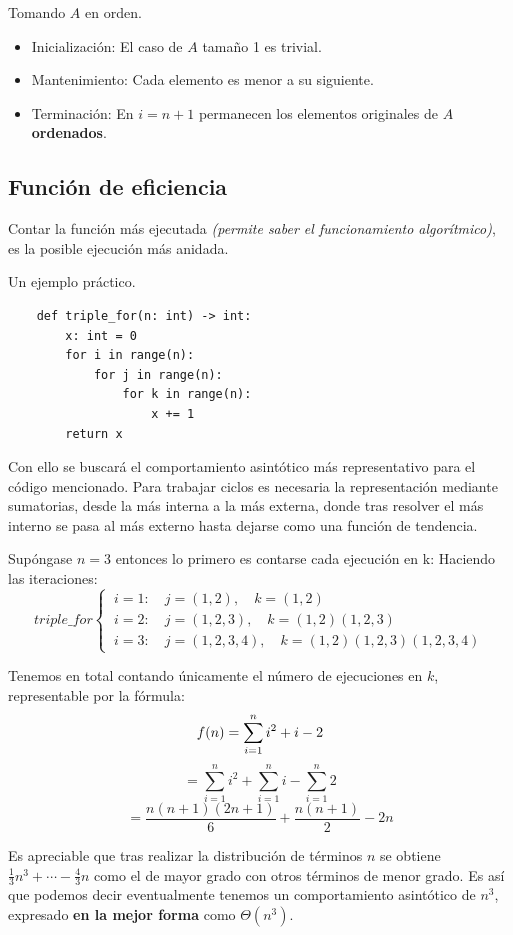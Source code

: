 \documentclass[tikz,11pt,fleqn]{book} %
\begin{document}
\begin{example}
Tomando $A$ en orden.
    \begin{itemize}
        \item Inicialización: El caso de $A$ tamaño 1 es trivial.
        \item Mantenimiento: Cada elemento es menor a su siguiente.
        \item Terminación: En $i=n+1$ permanecen los elementos originales de $A$ \textbf{ordenados}.
    \end{itemize}
\end{example}

\subsection{Función de eficiencia}

Contar la función más ejecutada \textit{(permite saber el funcionamiento algorítmico)}, es la posible ejecución más anidada.


\begin{example}
Un ejemplo práctico.

    \begin{lstlisting}
    def triple_for(n: int) -> int:
        x: int = 0
        for i in range(n):
            for j in range(n):
                for k in range(n):
                    x += 1
        return x
    \end{lstlisting}

    Con ello se buscará el comportamiento asintótico más representativo para el código mencionado.
    Para trabajar ciclos es necesaria la representación mediante sumatorias, desde la más interna a la más externa, donde tras resolver el más interno se pasa al más 
    externo hasta dejarse como una función de tendencia.

    Supóngase $n=3$ entonces lo primero es contarse cada ejecución en k:
    Haciendo las iteraciones:
    $$triple\_for\begin{cases}
        ~i=1:\quad j=(1,2),\quad k=(1,2) \\
        ~i=2:\quad j=(1,2,3),\quad k=(1,2)(1,2,3) \\
        ~i=3:\quad j=(1,2,3,4),\quad k=(1,2)(1,2,3)(1,2,3,4)
    \end{cases}$$

    \begin{remark}
        Tenemos en total contando únicamente el número de ejecuciones en $k$, representable por la fórmula:
        $$
            f(n)=\sum_{i=1}^n i^2+i-2 \\
        $$ $$
            =\sum_{i=1}^n i^2 + \sum_{i=1}^n i - \sum_{i=1}^n 2
        $$ $$
            =\frac{n(n+1)(2n+1)}6+\frac{n(n+1)}2-2n
        $$
    \end{remark}
    Es apreciable que tras realizar la distribución de términos $n$ se obtiene $\frac13n^3+\cdots-\frac43n$ como el de mayor grado con otros términos de menor grado. Es así que podemos decir eventualmente tenemos un comportamiento asintótico de $n^3$, expresado \textbf{en la mejor forma} como $\Theta(n^3)$.
\end{example}
\end{document}
